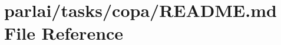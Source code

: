\hypertarget{parlai_2tasks_2copa_2README_8md}{}\section{parlai/tasks/copa/\+R\+E\+A\+D\+ME.md File Reference}
\label{parlai_2tasks_2copa_2README_8md}
